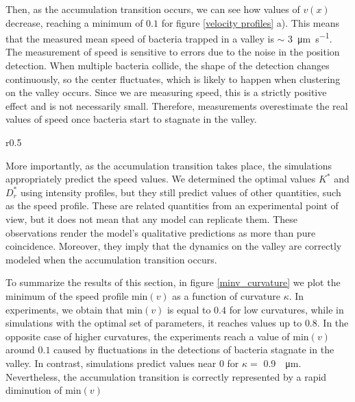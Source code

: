 Then, as the accumulation transition occurs, we can see how values of $v(x)$ decrease, reaching a minimum of $0.1$ for figure \ref{velocity profiles} a). This means that the measured mean speed of bacteria trapped in a valley is $\sim$ \SI[per-mode = symbol]{3}{\micro\meter\per\second}. The measurement of speed is sensitive to errors due to the noise in the position detection. When multiple bacteria collide, the shape of the detection changes continuously, so the center fluctuates, which is likely to happen when clustering on the valley occurs. Since we are measuring speed, this is a strictly positive effect and is not necessarily small. Therefore, measurements overestimate the real values of speed once bacteria start to stagnate in the valley.

\begin{wrapfigure}{r}{0.5\linewidth}
\vspace{-20pt}
\centering

\caption[Minmimum of the speed profile as a function of the curvature]{Minmimum of the speed profile $\text{min}(v)$ as a function of the curvature $\kappa$.}
\vspace{-15pt}
\label{minv_curvature}
\end{wrapfigure}

More importantly, as the accumulation transition takes place, the simulations appropriately predict the speed values. We determined the optimal values $K^*$ and $D_r^*$ using intensity profiles, but they still predict values of other quantities, such as the speed profile. These are related quantities from an experimental point of view, but it does not mean that any model can replicate them. These observations render the model's qualitative predictions as more than pure coincidence. Moreover, they imply that the dynamics on the valley are correctly modeled when the accumulation transition occurs.

To summarize the results of this section, in figure \ref{minv_curvature} we plot the minimum of the speed profile $\text{min}(v)$ as a function of curvature $\kappa$. In experiments, we obtain that $\text{min}(v)$ is equal to $0.4$ for low curvatures, while in simulations with the optimal set of parameters, it reaches values up to $0.8$. In the opposite case of higher curvatures, the experiments reach a value of $\text{min}(v)$ around $0.1$ caused by fluctuations in the detections of bacteria stagnate in the valley. In contrast, simulations predict values near $0$ for $\kappa=$ \SI{0.9}{\per\micro\meter}. Nevertheless, the accumulation transition is correctly represented by a rapid diminution of $\text{min}(v)$ 


